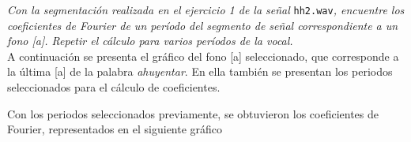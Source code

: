 

\textit{Con la segmentación realizada en el ejercicio 1 de la señal} \texttt{hh2.wav}\emph{, encuentre los coeficientes
de Fourier de un período del segmento de señal correspondiente a un fono [a]. Repetir el cálculo
para varios períodos de la vocal.}\\

	A continuación se presenta el gráfico del fono [a] seleccionado, que corresponde a la última [a] de la palabra \emph{ahuyentar}. En ella también se presentan los periodos seleccionados para el cálculo de coeficientes.

	\begin{figure}
		\centering
		\scalebox{0.6}{}
	\end{figure}

	Con los periodos seleccionados previamente, se obtuvieron los coeficientes de Fourier, representados en el siguiente gráfico

	
	\begin{figure}
		\centering
		\scalebox{0.6}{}
	\end{figure}
